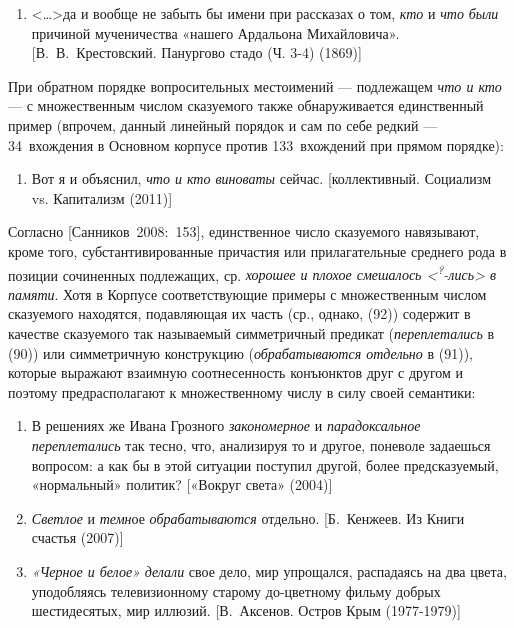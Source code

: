 \begin{enumerate}
  \def\labelenumi{(\arabic{enumi})}
  \setcounter{enumi}{87}
  \item
        \textless\ldots\textgreater да и вообще не забыть бы имени при
        рассказах о том, \textit{кто} и \textit{что} \textit{были} причиной
        мученичества «нашего Ардальона Михайловича». {[}В.~В.~Крестовский.
        Панургово стадо (Ч. 3-4) (1869){]}
\end{enumerate}

При обратном порядке вопросительных местоимений --- подлежащем \textit{что
  и кто} --- с множественным числом сказуемого также обнаруживается
единственный пример (впрочем, данный линейный порядок и сам по себе
редкий --- 34~вхождения в Основном корпусе против 133~вхождений при
прямом порядке):

\begin{enumerate}
  \def\labelenumi{(\arabic{enumi})}
  \setcounter{enumi}{88}
  \item
        Вот я и объяснил, \textit{что и кто виноваты} сейчас. {[}коллективный.
        Социализм vs. Капитализм (2011){]}
\end{enumerate}

Согласно {[}Санников~2008:~153{]}, единственное число сказуемого
навязывают, кроме того, субстантивированные причастия или прилагательные
среднего рода в позиции сочиненных подлежащих, ср. \textit{хорошее и
  плохое смешалось \textless{}\textsuperscript{?}-лись\textgreater{} в
  памяти}. Хотя в Корпусе соответствующие примеры с множественным числом
сказуемого находятся, подавляющая их часть (ср., однако, (92)) содержит
в качестве сказуемого так называемый симметричный предикат
(\textit{переплетались} в (90)) или симметричную конструкцию
(\textit{обрабатываются отдельно} в (91)), которые выражают взаимную
соотнесенность конъюнктов друг с другом и поэтому предрасполагают к
множественному числу в силу своей семантики:

\begin{enumerate}
  \def\labelenumi{(\arabic{enumi})}
  \setcounter{enumi}{89}
  \item
        В решениях же Ивана Грозного \textit{закономерное} и
        \textit{парадоксальное} \textit{переплетались} так тесно, что, анализируя
        то и другое, поневоле задаешься вопросом: а как бы в этой ситуации
        поступил другой, более предсказуемый, «нормальный» политик? {[}«Вокруг
        света» (2004){]}
  \item
        \textit{Светлое} и \textit{темн}ое \textit{обрабатываются} отдельно.
        {[}Б.~Кенжеев. Из Книги счастья (2007){]}
  \item
        \textit{«Черное и белое»} \textit{делали} свое дело, мир упрощался,
        распадаясь на два цвета, уподобляясь телевизионному старому
        до-цветному фильму добрых шестидесятых, мир иллюзий. {[}В.~Аксенов.
        Остров Крым (1977-1979){]}
\end{enumerate}

